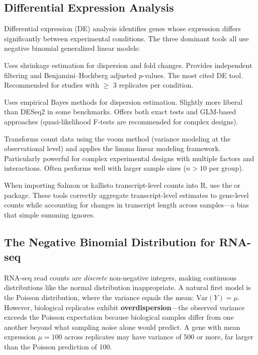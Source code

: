 \subsection{Differential Expression Analysis}

Differential expression (DE) analysis identifies genes whose expression differs
significantly between experimental conditions. The three dominant tools all use
negative binomial generalized linear models:

\begin{description}[style=nextline]
  \item[\software{DESeq2} (R/Bioconductor)] Uses shrinkage estimation for
    dispersion and fold changes. Provides independent filtering and Benjamini--Hochberg
    adjusted $p$-values. The most cited DE tool. Recommended for studies with
    $\geq$ 3 replicates per condition.
  \item[\software{edgeR} (R/Bioconductor)] Uses empirical Bayes methods for
    dispersion estimation. Slightly more liberal than DESeq2 in some benchmarks.
    Offers both exact tests and GLM-based approaches (quasi-likelihood F-tests
    are recommended for complex designs).
  \item[\software{limma-voom} (R/Bioconductor)] Transforms count data using the
    voom method (variance modeling at the observational level) and applies the
    limma linear modeling framework. Particularly powerful for complex
    experimental designs with multiple factors and interactions. Often performs
    well with larger sample sizes ($n > 10$ per group).
\end{description}

\begin{tipbox}
When importing Salmon or kallisto transcript-level counts into R, use the
 or  package. These tools correctly
aggregate transcript-level estimates to gene-level counts while accounting for
changes in transcript length across samples---a bias that simple summing ignores.
\end{tipbox}

\subsection{The Negative Binomial Distribution for RNA-seq}
\label{subsec:rnaseq:negbinom}

RNA-seq read counts are \emph{discrete} non-negative integers, making continuous
distributions like the normal distribution inappropriate. A natural first model
is the Poisson distribution, where the variance equals the mean:
$\text{Var}(Y) = \mu$. However, biological replicates exhibit
\textbf{overdispersion}---the observed variance exceeds the Poisson expectation
because biological samples differ from one another beyond what sampling noise
alone would predict. A gene with mean expression $\mu = 100$ across replicates
may have variance of 500 or more, far larger than the Poisson prediction of 100.

